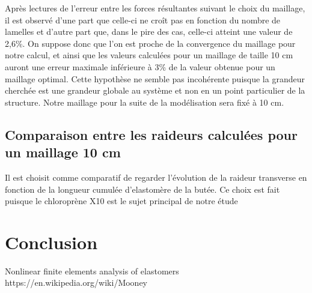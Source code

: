 ﻿\documentclass{article}
\begin{document}
Après lectures de l'erreur entre les forces résultantes suivant le choix du maillage, il est observé d'une part que celle-ci ne croît pas en fonction du nombre de lamelles et d'autre part que, dans le pire des cas, celle-ci atteint une valeur de 2,6\%. On suppose donc que l'on est proche de la convergence du maillage pour notre calcul, et ainsi que les valeurs calculées pour un maillage de taille 10 cm auront une erreur maximale inférieure à 3\% de la valeur obtenue pour un maillage optimal. Cette hypothèse ne semble pas incohérente puisque la grandeur cherchée est une grandeur globale au système et non en un point particulier de la structure.  Notre maillage pour la suite de la modélisation sera fixé à 10 cm.

\subsection{Comparaison entre les raideurs calculées pour un maillage 10 cm}
Il est choisit comme comparatif de regarder l'évolution de la raideur transverse en fonction de la longueur cumulée d'elastomère de la butée. Ce choix est fait puisque le chloroprène X10 est le sujet principal de notre étude



\section{Conclusion}

\listoffigures

\begin{thebibliography}{9}
 Nonlinear finite elements analysis of elastomers
 https://en.wikipedia.org/wiki/Mooney%
\end{thebibliography}
\end{document}

